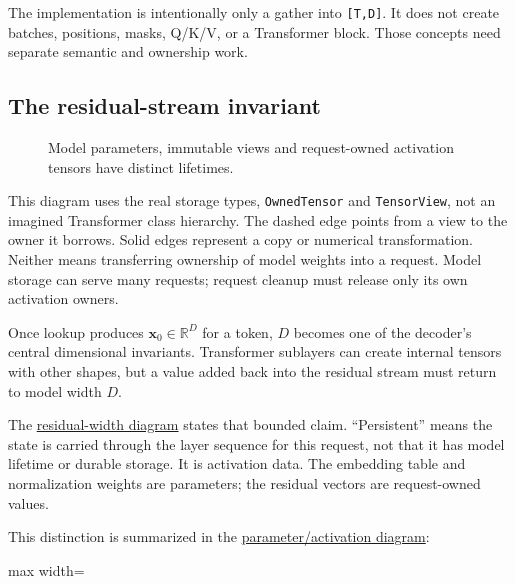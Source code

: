 \documentclass[
  10pt,
]{article}
\begin{document}
The implementation is intentionally only a gather into
\texttt{{[}T,D{]}}. It does not create batches, positions, masks, Q/K/V,
or a Transformer block. Those concepts need separate semantic and
ownership work.

\subsection{The residual-stream
invariant}\label{the-residual-stream-invariant}

\begin{figure}[H]\centering\resizebox{\linewidth}{!}{}\caption{Model parameters, immutable views and request-owned activation tensors have distinct lifetimes.}\end{figure}

This diagram uses the real storage types, \texttt{OwnedTensor} and
\texttt{TensorView}, not an imagined Transformer class hierarchy. The
dashed edge points from a view to the owner it borrows. Solid edges
represent a copy or numerical transformation. Neither means transferring
ownership of model weights into a request. Model storage can serve many
requests; request cleanup must release only its own activation owners.

Once lookup produces \(\mathbf{x}_0\in\mathbb{R}^{D}\) for a token,
\(D\) becomes one of the decoder's central dimensional invariants.
Transformer sublayers can create internal tensors with other shapes, but
a value added back into the residual stream must return to model width
\(D\).

The
\href{https://github.com/hermonai/inside-the-llm-engine/blob/astra-visual-rewrite/diagrams/transformer/residual-stream-width.txt}{residual-width
diagram} states that bounded claim. ``Persistent'' means the state is
carried through the layer sequence for this request, not that it has
model lifetime or durable storage. It is activation data. The embedding
table and normalization weights are parameters; the residual vectors are
request-owned values.

This distinction is summarized in the
\href{https://github.com/hermonai/inside-the-llm-engine/blob/astra-visual-rewrite/diagrams/transformer/parameters-vs-activations.txt}{parameter/activation
diagram}:

\begin{center}\begin{adjustbox}{max width=\linewidth}\end{adjustbox}\end{center}
\end{document}
